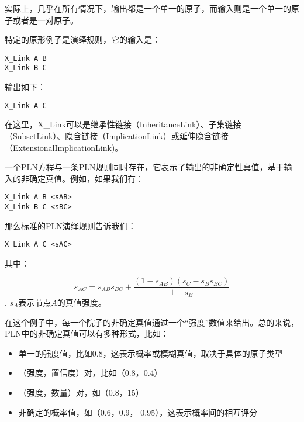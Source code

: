 实际上，几乎在所有情况下，输出都是一个单一的原子，而输入则是一个单一的原子或者是一对原子。

特定的原形例子是演绎规则，它的输入是：

{\tt\begin{small}\begin{lstlisting}
X_Link A B
X_Link B C
\end{lstlisting}\end{small}}

输出如下：

{\tt\begin{small}\begin{lstlisting}
X_Link A C
\end{lstlisting}\end{small}}

在这里，X\_Link可以是继承性链接（InheritanceLink）、子集链接（SubsetLink）、隐含链接（ImplicationLink）或延伸隐含链接（ExtensionalImplicationLink)。

一个PLN方程与一条PLN规则同时存在，它表示了输出的非确定性真值，基于输入的非确定真值。例如，如果我们有：

{\tt\begin{small}\begin{lstlisting}
X_Link A B <sAB>
X_Link B C <sBC>
\end{lstlisting}\end{small}}



那么标准的PLN演绎规则告诉我们：

{\tt\begin{small}\begin{lstlisting}
X_Link A C <sAC>
\end{lstlisting}\end{small}}

其中： 

$$
s_{AC}=s_{AB}s_{BC}+\frac{\left(1-s_{AB}\right)\left(s_C-s_Bs_{BC}\right)}{1-s_B}
$$, $s_A$表示节点$A$的真值强度。

在这个例子中，每一个院子的非确定真值通过一个“强度”数值来给出。总的来说，PLN中的非确定真值可以有多种形式，比如：

\begin{itemize}
\item 单一的强度值，比如0.8，这表示概率或模糊真值，取决于具体的原子类型
\item （强度，置信度）对，比如（0.8，0.4）
\item （强度，数量）对，如（0.8，15）
\item 非确定的概率值，如（0.6，0.9， 0.95），这表示概率间的相互评分
\end{itemize}

